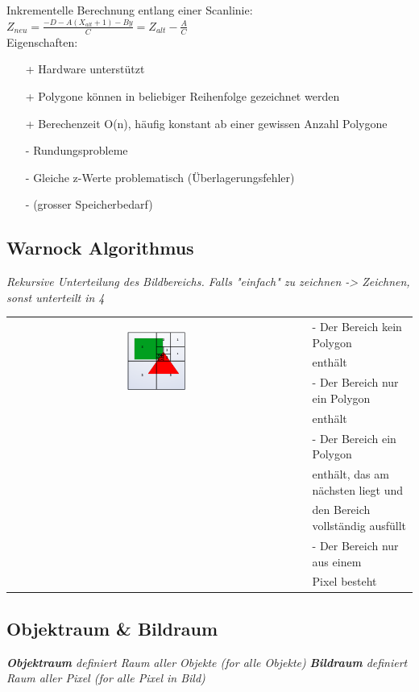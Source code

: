 Inkrementelle Berechnung entlang einer Scanlinie:\\
$Z_{neu} = \frac{-D -A(X_{alt} + 1) - By}{C} = Z_{alt} - \frac{A}{C}$ \\

Eigenschaften:
\begin{itemize}
  \item[+] Hardware unterstützt
  \item[+] Polygone können in beliebiger Reihenfolge gezeichnet werden
  \item[+] Berechenzeit O(n), häufig konstant ab einer gewissen Anzahl Polygone
  \item[-] Rundungsprobleme
  \item[-] Gleiche z-Werte problematisch (Überlagerungsfehler)
  \item[-] (grosser Speicherbedarf)
\end{itemize}

\subsection{Warnock Algorithmus}
\textit{Rekursive Unterteilung des Bildbereichs. Falls "einfach" zu zeichnen -> Zeichnen, sonst unterteilt in 4}\\

\begin{tabular}{cl}
  \multirow{3}{*}{
    \includegraphics[width=0.2\textwidth]{assets/warnock-alg.png}
  } & - Der Bereich kein Polygon \\
  & enthält \\
  & - Der Bereich nur ein Polygon \\
  & enthält \\
  & - Der Bereich ein Polygon \\
  & enthält, das am nächsten liegt und \\
  & den Bereich vollständig ausfüllt \\
  & - Der Bereich nur aus einem \\
  & Pixel besteht \\
\end{tabular}

\subsection{Objektraum \& Bildraum}

\textit{\textbf{Objektraum} definiert Raum aller Objekte (for alle Objekte)}
\textit{\textbf{Bildraum} definiert Raum aller Pixel (for alle Pixel in Bild)}
